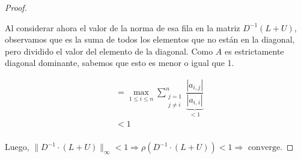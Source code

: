 \documentclass[]{article}
\begin{document}
\begin{prop}
\begin{proof}
\begin{center}
			\end{center}

			Al considerar ahora el valor de la norma de esa fila en la matriz $D^{-1}(L+U)$, observamos que es la suma de todos los elementos que no están en la diagonal, pero dividido el valor del elemento de la diagonal. Como $A$ es estrictamente diagonal dominante, sabemos que esto es menor o igual que 1.

		\begin{align*}
			&= \max_{1\leq i\leq n}{\sum_{\substack{j=1 \\ j\neq i}}^n}{\underbrace{\dfrac{|a_{i,j}|}{|a_{i,i}|}}_{< 1}}\\
			&< 1\\
		\end{align*}

		Luego, $\|D^{-1}\cdot(L+U)\|_\infty < 1 \Rightarrow \rho(D^{-1}\cdot(L+U)) < 1 \Rightarrow \text{ converge.}$
	\end{proof}
\end{prop}
\end{document}
